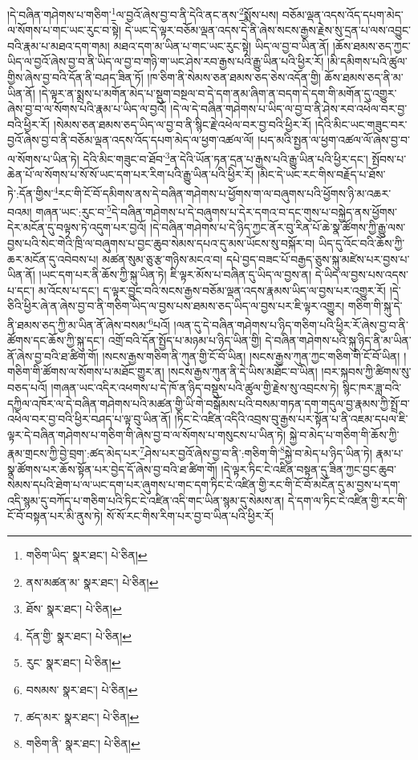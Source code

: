 །དེ་བཞིན་གཤེགས་པ་གཅིག་\footnote{གཅིག་ཡིད་  སྣར་ཐང་།  པེ་ཅིན། }ལ་བྱའོ་ཞེས་བྱ་བ་ནི་དེའི་ནང་ནས་\footnote{ནས་མཚན་མ་  སྣར་ཐང་།  པེ་ཅིན། }སྨོས་པས། བཅོམ་ལྡན་འདས་འོད་དཔག་མེད་ལ་སོགས་པ་གང་ཡང་རུང་བ་སྟེ། དེ་ཡང་དེ་ལྟར་བཅོམ་ལྡན་འདས་དེ་ནི་ཞེས་སངས་རྒྱས་རྗེས་སུ་དྲན་པ་ལས་འབྱུང་བའི་རྣམ་པ་མཐའ་དག་གམ། མཐའ་དག་མ་ཡིན་པ་གང་ཡང་རུང་སྟེ། ཡིད་ལ་བྱ་བ་ཡིན་ནོ། །ཆོས་ཐམས་ཅད་ཀྱང་ཡིད་ལ་བྱའོ་ཞེས་བྱ་བ་ནི་ཡིད་ལ་བྱ་བ་གཉི་ག་ཡང་ཤེས་རབ་རྒྱས་པའི་རྒྱུ་ཡིན་པའི་ཕྱིར་རོ། །མི་དམིགས་པའི་ཚུལ་གྱིས་ཞེས་བྱ་བའི་དོན་ནི་བཤད་ཟིན་ཏོ། །ཁ་ཅིག་ནི་སེམས་ཅན་ཐམས་ཅད་ཅེས་འདོན་གྱི། ཆོས་ཐམས་ཅད་ནི་མ་ཡིན་ནོ། །དེ་ལྟར་ན་སྨྲས་པ་མགོན་མེད་པ་སྡུག་བསྔལ་བ་དེ་དག་ནམ་ཞིག་ན་བདག་དེ་དག་གི་མགོན་དུ་འགྱུར་ཞེས་བྱ་བ་ལ་སོགས་པའི་རྣམ་པ་ཡིད་ལ་བྱའོ། །དེ་ལ་དེ་བཞིན་གཤེགས་པ་ཡིད་ལ་བྱ་བ་ནི་ཤེས་རབ་འཕེལ་བར་བྱ་བའི་ཕྱིར་རོ། །སེམས་ཅན་ཐམས་ཅད་ཡིད་ལ་བྱ་བ་ནི་སྙིང་རྗེ་འཕེལ་བར་བྱ་བའི་ཕྱིར་རོ། །དེའི་མིང་ཡང་གཟུང་བར་བྱའོ་ཞེས་བྱ་བ་ནི་བཅོམ་ལྡན་འདས་འོད་དཔག་མེད་ལ་ཕྱག་འཚལ་ལོ། །པད་མའི་སྤྱན་ལ་ཕྱག་འཚལ་ལོ་ཞེས་བྱ་བ་ལ་སོགས་པ་ཡིན་ཏེ། དེའི་མིང་གཟུང་བ་ཐོབ་\footnote{ཐོས་  སྣར་ཐང་།  པེ་ཅིན། }ན་དེའི་ཡོན་ཏན་དྲན་པ་རྒྱས་པའི་རྒྱུ་ཡིན་པའི་ཕྱིར་དང་། སྤོབས་པ་ཆེན་པོ་ལ་སོགས་པ་སོ་སོ་ཡང་དག་པར་རིག་པའི་རྒྱུ་ཡིན་པའི་ཕྱིར་རོ། །མིང་དེ་ཡང་རང་གིས་བརྗོད་པ་ཐོས་ཏེ་:དོན་གྱིས་\footnote{དོན་གྱི་  སྣར་ཐང་།  པེ་ཅིན། }རང་གི་ངོ་བོ་དམིགས་ནས་དེ་བཞིན་གཤེགས་པ་ཕྱོགས་ག་ལ་བཞུགས་པའི་ཕྱོགས་ཉི་མ་འཆར་བའམ། གཞན་ཡང་:རུང་བ་\footnote{རུང་  སྣར་ཐང་།  པེ་ཅིན། }དེ་བཞིན་གཤེགས་པ་དེ་བཞུགས་པ་དེར་དགའ་བ་དང་གུས་པ་བསྐྱེད་ནས་ཕྱོགས་དེར་མངོན་དུ་བལྟས་ཏེ་འདུག་པར་བྱའོ། །དེ་བཞིན་གཤེགས་པ་དེ་ཉིད་ཀྱང་ནོར་བུ་རིན་པོ་ཆེ་སྣ་ཚོགས་ཀྱི་རྒྱུ་ལས་བྱས་པའི་སེང་གེའི་ཁྲི་ལ་བཞུགས་པ་བྱང་ཆུབ་སེམས་དཔའ་དུ་མས་ཡོངས་སུ་བསྐོར་བ། ཡིད་དུ་འོང་བའི་ཆོས་ཀྱི་ཆར་མངོན་དུ་འབེབས་པ། མཚན་སུམ་ཅུ་རྩ་གཉིས་མངའ་བ། དཔེ་བྱད་བཟང་པོ་བརྒྱད་ཅུས་སྐུ་མཛེས་པར་བྱས་པ་ཡིན་ནོ། །ཡང་དག་པར་ནི་ཆོས་ཀྱི་སྐུ་ཡིན་ཏེ། ཇི་ལྟར་མོས་པ་བཞིན་དུ་ཡིད་ལ་བྱས་ན། དེ་ཡིད་ལ་བྱས་པས་འདས་པ་དང་། མ་འོངས་པ་དང་། ད་ལྟར་བྱུང་བའི་སངས་རྒྱས་བཅོམ་ལྡན་འདས་རྣམས་ཡིད་ལ་བྱས་པར་འགྱུར་རོ། །དེ་ཅིའི་ཕྱིར་ཞེ་ན་ཞེས་བྱ་བ་ནི་གཅིག་ཡིད་ལ་བྱས་པས་ཐམས་ཅད་ཡིད་ལ་བྱས་པར་ཇི་ལྟར་འགྱུར། གཅིག་གི་སྐུ་དེ་ནི་ཐམས་ཅད་ཀྱི་མ་ཡིན་ནོ་ཞེས་བསམ་\footnote{བསམས་  སྣར་ཐང་།  པེ་ཅིན། }པའོ། །ལན་དུ་དེ་བཞིན་གཤེགས་པ་ཉིད་གཅིག་པའི་ཕྱིར་རོ་ཞེས་བྱ་བ་ནི་ཚོགས་དང་ཆོས་ཀྱི་སྐུ་དང་། འགྲོ་བའི་དོན་སྤྱོད་པ་མཉམ་པ་ཉིད་ཡིན་གྱི། དེ་བཞིན་གཤེགས་པའི་སྐུ་ཉིད་ནི་མ་ཡིན་ནོ་ཞེས་བྱ་བའི་ཐ་ཚིག་གོ། །སངས་རྒྱས་གཅིག་ནི་ཀུན་གྱི་ངོ་བོ་ཡིན། །སངས་རྒྱས་ཀུན་ཀྱང་གཅིག་གི་ངོ་བོ་ཡིན། །གཅིག་གི་ཚོགས་ལ་སོགས་པ་མཐོང་གྱུར་ན། །སངས་རྒྱས་ཀུན་ནི་དེ་ཡིས་མཐོང་བ་ཡིན། །བར་སྐབས་ཀྱི་ཚིགས་སུ་བཅད་པའོ། །གཞན་ཡང་འདིར་འཕགས་པ་དེ་ཁོ་ན་ཉིད་བསྡུས་པའི་ཚུལ་གྱི་རྗེས་སུ་འབྲངས་ཏེ། སྙིང་ཁར་ཟླ་བའི་དཀྱིལ་འཁོར་ལ་དེ་བཞིན་གཤེགས་པའི་མཚན་གྱི་ཡི་གེ་བསྒོམས་པའི་བསམ་གཏན་དག་གདུལ་བྱ་རྣམས་ཀྱི་སྤྲོ་བ་འཕེལ་བར་བྱ་བའི་ཕྱིར་བཤད་པ་ལྟ་བུ་ཡིན་ནོ། །ཏིང་ངེ་འཛིན་འདིའི་འབྲས་བུ་རྒྱས་པར་སྟོན་པ་ནི་འཇམ་དཔལ་ཇི་ལྟར་དེ་བཞིན་གཤེགས་པ་གཅིག་གི་ཞེས་བྱ་བ་ལ་སོགས་པ་གསུངས་པ་ཡིན་ཏེ། སྐྱེ་བ་མེད་པ་གཅིག་གི་ཆོས་ཀྱི་རྣམ་གྲངས་ཀྱི་བྱེ་བྲག་:ཚད་མེད་པར་\footnote{ཚད་མར་  སྣར་ཐང་།  པེ་ཅིན། }ཤེས་པར་བྱའོ་ཞེས་བྱ་བ་ནི་:གཅིག་གི་\footnote{གཅིག་ནི་  སྣར་ཐང་།  པེ་ཅིན། }སྐྱེ་བ་མེད་པ་ཉིད་ཡིན་ཏེ། རྣམ་པ་སྣ་ཚོགས་པར་ཆོས་སྟོན་པར་བྱེད་དོ་ཞེས་བྱ་བའི་ཐ་ཚིག་གོ། །དེ་ལྟར་ཏིང་ངེ་འཛིན་བསྟན་དུ་ཟིན་ཀྱང་བྱང་ཆུབ་སེམས་དཔའི་ཐེག་པ་ལ་ཡང་དག་པར་ཞུགས་པ་གང་དག་ཏིང་ངེ་འཛིན་གྱི་རང་གི་ངོ་བོ་མངོན་དུ་མ་བྱས་པ་དག་འདི་སྙམ་དུ་བཀོད་པ་གཅིག་པའི་ཏིང་ངེ་འཛིན་འདི་གང་ཡིན་སྙམ་དུ་སེམས་ན། དེ་དག་ལ་ཏིང་ངེ་འཛིན་གྱི་རང་གི་ངོ་བོ་བསྟན་པར་མི་ནུས་ཏེ། སོ་སོ་རང་གིས་རིག་པར་བྱ་བ་ཡིན་པའི་ཕྱིར་རོ། 